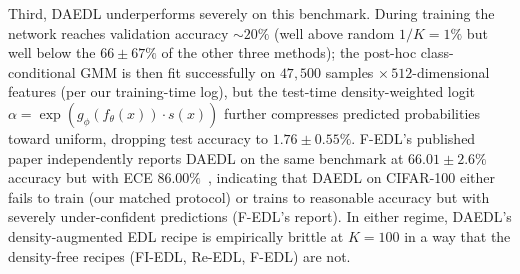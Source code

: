 \documentclass[review,5p,times]{elsarticle}
\begin{document}
Third, DAEDL underperforms severely on this benchmark. During training
the network reaches validation accuracy $\sim\!20\%$ (well above
random $1/K\!=\!1\%$ but well below the $66\!\pm\!67\%$ of the other
three methods); the post-hoc class-conditional GMM is then fit
successfully on $47{,}500$ samples $\times\,512$-dimensional features
(per our training-time log), but the test-time density-weighted logit
$\alpha\!=\!\exp(g_{\phi}(f_{\theta}(x))\!\cdot\!s(x))$ further
compresses predicted probabilities toward uniform, dropping test
accuracy to $1.76\!\pm\!0.55\%$. F-EDL's published paper independently
reports DAEDL on the same benchmark at $66.01\!\pm\!2.6\%$ accuracy
but with ECE $86.00\%$~\citep{yoon2025fedl}, indicating that DAEDL on
CIFAR-100 either fails to train (our matched protocol) or trains to
reasonable accuracy but with severely under-confident predictions
(F-EDL's report). In either regime, DAEDL's density-augmented EDL
recipe is empirically brittle at $K\!=\!100$ in a way that the
density-free recipes (FI-EDL, Re-EDL, F-EDL) are not.
\end{document}
